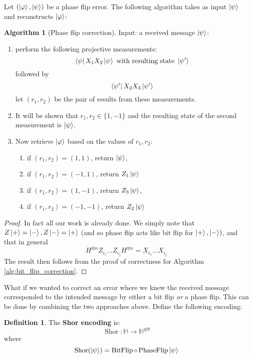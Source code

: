 \documentclass[12pt]{article}
\theoremstyle{plain}
\theoremstyle{definition}
\newtheorem{defn}[thm]{Definition} %
\newtheorem{algorithm}[thm]{Algorithm}
\newcommand{\bb}[1]{\mathbb{#1}}
\newcommand{\lto}{\longrightarrow}
\begin{document}
Let $(\ket{\varphi},\ket{\psi})$ be a phase flip error. The following algorithm takes as input $\ket{\psi}$ and reconstructs $\ket{\varphi}$:
\begin{algorithm}[Phase flip correction]
	Input: a received message $\ket{\psi}$:
	\begin{enumerate}
		\item perform the following projective measurements:
		\begin{equation}
			\bra{\psi} X_1 X_2 \ket{\psi} \text{ with resulting state }\ket{\psi'}
		\end{equation}
		followed by
		\begin{equation}
			\bra{\psi'} X_2 X_3 \ket{\psi'}
		\end{equation}
		let $(r_1,r_2)$ be the pair of results from these measurements.
		\item It will be shown that $r_1, r_2 \in \lbrace 1, -1\rbrace$ and the resulting state of the second measurement is $\ket{\psi}$.
		\item Now retrieve $\ket{\varphi}$ based on the values of $r_1,r_2$:
		\begin{enumerate}
			\item if $(r_1,r_2) = (1,1)$, return $\ket{\psi}$,
			\item if $(r_1,r_2) = (-1,1)$, return $Z_1 \ket{\psi}$
			\item if $(r_1,r_2) = (1,-1)$, return $Z_3 \ket{\psi}$,
			\item if $(r_1,r_2) = (-1,-1)$, return $Z_2 \ket{\psi}$
		\end{enumerate}
	\end{enumerate}
\end{algorithm}
\begin{proof}
	In fact all our work is already done. We simply note that $Z\ket{+} = \ket{-}, Z\ket{-} = \ket{+}$ (and so phase flip acts like bit flip for $\ket{+},\ket{-})$, and that  in general
	\begin{equation}
		H^{\otimes n}Z_{i_1}\hdots Z_{i_j}H^{\otimes n} = X_{i_1}\hdots X_{i_j}
	\end{equation}
	The result then follows from the proof of correctness for Algorithm \ref{alg:bit_flip_correction}.
\end{proof}
What if we wanted to correct an error where we knew the received message corresponded to the intended message by either a bit flip \emph{or} a phase flip. This can be done by combining the two approaches above. Define the following encoding:
\begin{defn}
	The \textbf{Shor encoding} is:
	\begin{equation}
		\operatorname{Shor}: \bb{H} \lto \bb{H}^{\otimes 9}
	\end{equation}
	where
	\begin{equation}
		\operatorname{Shor}(\ket{\psi}) = \operatorname{BitFlip} \circ \operatorname{PhaseFlip}\ket{\psi}
	\end{equation}
\end{defn}
\end{document}
